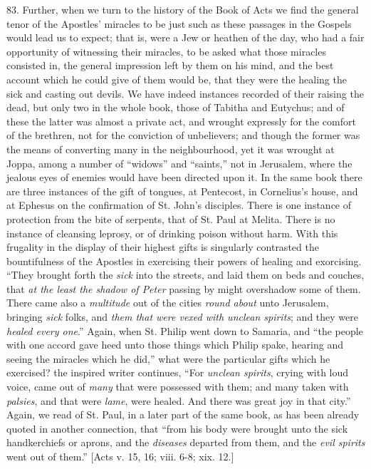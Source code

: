 83.
Further, when we turn to the history of the Book of Acts we find the
general tenor of the Apostles' miracles to be just such as these
passages in the Gospels would lead us to expect; that is, were a Jew
or heathen of the day, who had a fair opportunity of witnessing their
miracles, to be asked what those miracles consisted in, the general
impression left by them on his mind, and the best account which he
could give of them would be, that they were the healing the sick and
casting out devils. We have indeed instances recorded of their raising
the dead, but only two in the whole book, those of Tabitha and
Eutychus; and of these the latter was almost a private act, and
wrought expressly for the comfort of the brethren, not for the
conviction of unbelievers; and though the former was the means of
converting many in the neighbourhood, yet it was wrought at Joppa,
among a number of ``widows'' and ``saints,'' not in Jerusalem, where the
jealous eyes of enemies would have been directed upon it. In the same
book there are three instances of the gift of tongues, at Pentecost,
in Cornelius's house, and at Ephesus on the confirmation of St. John's
disciples. There is one instance of protection from the bite of
serpents, that of St. Paul at Melita. There is no instance of
cleansing leprosy, or of drinking poison without harm. With this
frugality in the display of their highest gifts is singularly
contrasted the bountifulness of the Apostles in exercising their
powers of healing and exorcising. ``They brought forth the \emph{sick}
into the streets, and laid them on beds and couches, that \emph{at the
least the shadow of Peter} passing by might overshadow some of
them. There came also a \emph{multitude} out of the cities \emph{round
about} unto Jerusalem, bringing \emph{sick} folks, and \emph{them that
were vexed with unclean spirits}; and they were \emph{healed every one}.''
Again, when St. Philip went down to Samaria, and ``the people with one
accord gave heed unto those things which Philip spake, hearing and
seeing the miracles which he did,'' what were the particular gifts
which he exercised? the inspired writer continues, ``For \emph{unclean
spirits}, crying with loud voice, came out of \emph{many}
that were possessed with them; and many taken with \emph{palsies}, and
that were \emph{lame}, were healed. And there was great joy in that
city.'' Again, we read of St. Paul, in a later part of the same book,
as has been already quoted in another connection, that ``from his body
were brought unto the sick handkerchiefs or aprons, and the \emph{diseases}
departed from them, and the \emph{evil spirits} went out of them.''
[Acts v. 15, 16; viii. 6-8; xix. 12.]

